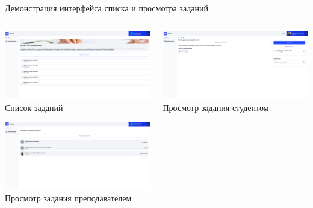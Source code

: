 \documentclass[aspectratio=169]{beamer}
\begin{document}
\begin{frame}{Демонстрация интерфейса списка и просмотра заданий}
\vspace{0.5em}

\begin{columns}
    \begin{column}{0.5\textwidth}
        \centering
        \includegraphics[width=0.9\linewidth]{static/TaskListTeacher.png} \\
        \small Список заданий

        \vspace{1em}

        \includegraphics[width=0.9\linewidth]{static/TaskTeacherDetail.png} \\
        \small Просмотр задания преподавателем
    \end{column}
    \begin{column}{0.5\textwidth}
        \centering
        \includegraphics[width=0.95\linewidth]{static/TaskStudentNotSend.png} \\
        \small Просмотр задания студентом
    \end{column}
\end{columns}
\end{frame}
\end{document}
